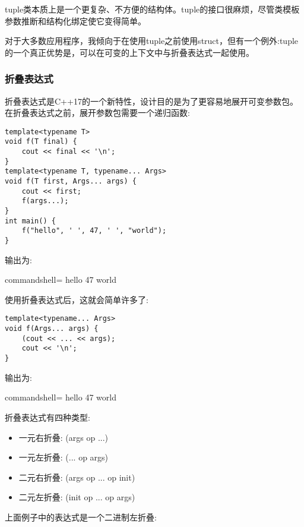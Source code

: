 
tuple类本质上是一个更复杂、不方便的结构体。tuple的接口很麻烦，尽管类模板参数推断和结构化绑定使它变得简单。

对于大多数应用程序，我倾向于在使用tuple之前使用struct，但有一个例外:tuple的一个真正优势是，可以在可变的上下文中与折叠表达式一起使用。

\subsubsection{折叠表达式}

折叠表达式是C++17的一个新特性，设计目的是为了更容易地展开可变参数包。在折叠表达式之前，展开参数包需要一个递归函数:

\begin{lstlisting}[style=styleCXX]
template<typename T>
void f(T final) {
	cout << final << '\n';
}
template<typename T, typename... Args>
void f(T first, Args... args) {
	cout << first;
	f(args...);
}
int main() {
	f("hello", ' ', 47, ' ', "world");
}
\end{lstlisting}

输出为:

\begin{tcblisting}{commandshell={}}
hello 47 world
\end{tcblisting}

使用折叠表达式后，这就会简单许多了:

\begin{lstlisting}[style=styleCXX]
template<typename... Args>
void f(Args... args) {
	(cout << ... << args);
	cout << '\n';
}
\end{lstlisting}

输出为:

\begin{tcblisting}{commandshell={}}
hello 47 world
\end{tcblisting}

折叠表达式有四种类型:

\begin{itemize}
\item 
一元右折叠: (args op ...)

\item 
一元左折叠: (... op args)

\item 
二元右折叠: (args op ... op init)

\item 
二元左折叠: (init op ... op args)
\end{itemize}

上面例子中的表达式是一个二进制左折叠:

